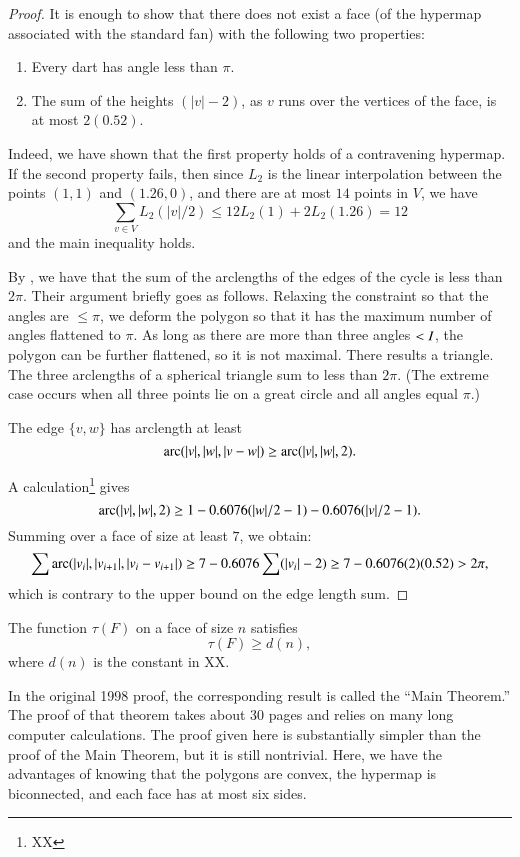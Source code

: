 \begin{proof} It is enough to show that there does not exist a face (of the hypermap associated with the standard fan)
with the following two properties:
\begin{enumerate}
\item Every dart has angle less than $\pi$.
\item The sum of the heights $(|v|-2)$, as $v$ runs
over the vertices of the face, is at most $2(0.52)$.
\end{enumerate}
Indeed, we have shown that the first property holds
of a contravening hypermap.  If the second property fails,
then since $L_2$ is the linear interpolation between
the points $(1,1)$ and $(1.26,0)$, and there are at most
$14$ points in $V$, we have
$$\sum_{v\in V}L_2(|v|/2) \le 12 L_2(1) + 2 L_2(1.26) =12$$
and the main inequality holds.

By \cite{vanderWaerden:1951}, we have that the sum of
the arclengths of the edges of the cycle is less than
$2\pi$.  Their argument briefly goes as follows. Relaxing the constraint so that the angles are $\le \pi$, we deform the polygon so that it has the maximum number of angles flattened to $\pi$.  As long as there are more than three angles $<I$, the polygon can be further flattened, so it is not maximal.  There results a triangle.  The three arclengths of a spherical triangle sum to less than $2\pi$.  (The extreme case occurs when all three points lie on a great circle and all angles equal $\pi$.)

The edge $\{v,w\}$ has arclength at least
$$
\operatorname{arc}(|v|,|w|,|v-w|) \ge \operatorname{arc}(|v|,|w|,2). 
$$

A calculation\footnote{XX} gives
$$
\operatorname{arc}(|v|,|w|,2)\ge 1 - 0.6076 (|w|/2 - 1) - 0.6076 (|v|/2 - 1).
$$
Summing over a face of size at least $7$, we obtain:
$$
\sum \operatorname{arc}(|v_i|,|v_{i+1}|,|v_i-v_{i+1}|)\ge
7 - 0.6076 \sum (|v_i|-2) \ge 7 - 0.6076 (2) (0.52) > 2\pi,
$$
which is contrary to the upper bound on the edge length
sum.
\end{proof}

\begin{lemma}  The function $\tau(F)$ on a face of
size $n$ satisfies 
$$
\tau(F) \ge d(n),
$$
where $d(n)$ is the constant in XX.
\end{lemma}

In the original 1998 proof, the corresponding result
is called the ``Main Theorem.''  The proof of that 
theorem takes about 30 pages and relies on many
long computer calculations.  The proof given here
is substantially simpler than the proof of the
Main Theorem, but
it is still nontrivial.  Here, we have the advantages
of knowing that the polygons are convex, the hypermap
is biconnected, and each face has at most six sides.

